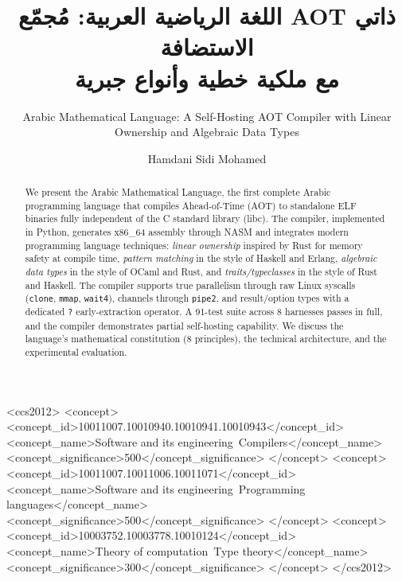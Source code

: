 \documentclass[sigconf]{acmart}
\begin{document}
\title[اللغة الرياضية العربية]{اللغة الرياضية العربية: مُجمّع AOT ذاتي الاستضافة\\مع ملكية خطية وأنواع جبرية}
\subtitle{Arabic Mathematical Language: A Self-Hosting AOT Compiler with Linear Ownership and Algebraic Data Types}

\author{Hamdani Sidi Mohamed}

\begin{abstract}
We present the Arabic Mathematical Language, the first complete Arabic programming
language that compiles Ahead-of-Time (AOT) to standalone ELF binaries fully
independent of the C standard library (libc). The compiler, implemented in Python,
generates x86\_64 assembly through NASM and integrates modern programming language
techniques: \textit{linear ownership} inspired by Rust for memory safety at compile
time, \textit{pattern matching} in the style of Haskell and Erlang,
\textit{algebraic data types} in the style of OCaml and Rust, and
\textit{traits/typeclasses} in the style of Rust and Haskell. The compiler supports
true parallelism through raw Linux syscalls (\texttt{clone}, \texttt{mmap},
\texttt{wait4}), channels through \texttt{pipe2}, and result/option types with a
dedicated \texttt{?} early-extraction operator. A 91-test suite across 8 harnesses
passes in full, and the compiler demonstrates partial self-hosting capability.
We discuss the language's mathematical constitution (8 principles), the technical
architecture, and the experimental evaluation.
\end{abstract}

\begin{CCSXML}
<ccs2012>
<concept>
<concept_id>10011007.10010940.10010941.10010943</concept_id>
<concept_name>Software and its engineering~Compilers</concept_name>
<concept_significance>500</concept_significance>
</concept>
<concept>
<concept_id>10011007.10011006.10011071</concept_id>
<concept_name>Software and its engineering~Programming languages</concept_name>
<concept_significance>500</concept_significance>
</concept>
<concept>
<concept_id>10003752.10003778.10010124</concept_id>
<concept_name>Theory of computation~Type theory</concept_name>
<concept_significance>300</concept_significance>
</concept>
</ccs2012>
\end{CCSXML}

\end{document}
